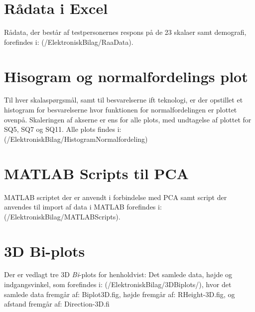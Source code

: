 \section{Rådata i Excel}
\label{ElektroniskBilagExcel}
%
Rådata, der består af testpersonernes respons på de 23 skalaer samt demografi, forefindes i: (/ElektroniskBilag/RaaData).

\section{Hisogram og normalfordelings plot}
\label{ElektroniskBilagHistNormal}
%
Til hver skalaspørgsmål, samt til besvarelserne ift teknologi, er der opstillet et histogram for besvarelserne hvor funktionen for normalfordelingen er plottet ovenpå.  
Skaleringen af akserne er ens for alle plots, med undtagelse af plottet for SQ5, SQ7 og SQ11. Alle plots findes i: (/ElektroniskBilag/HistogramNormalfordeling)

\section{MATLAB Scripts til PCA}
\label{ElektroniskBilagMatLabPCA}
%
MATLAB scriptet der er anvendt i forbindelse med PCA samt script der anvendes til import af data i MATLAB forefindes i: (/ElektroniskBilag/MATLABScripts).

\section{3D Bi-plots}
\label{ElektroniskBilag3D}
%
Der er vedlagt tre 3D \textit{Bi}-plots for henholdvist: Det samlede data, højde og indgangsvinkel, som forefindes i: (/ElektroniskBilag/3DBiplots/), hvor det samlede data fremgår af: Biplot3D.fig, højde fremgår af: RHeight-3D.fig, og afstand fremgår af: Direction-3D.fi

